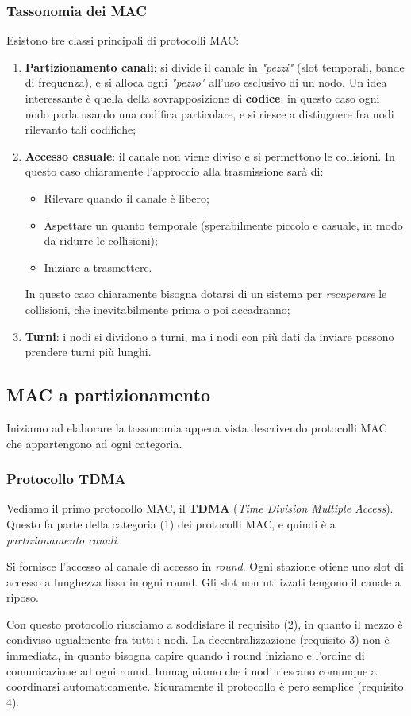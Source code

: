 \documentclass[a4paper,11pt]{article}
\begin{document}
\subsubsection{Tassonomia dei MAC}
Esistono tre classi principali di protocolli MAC:
\begin{enumerate}
	\item \textbf{Partizionamento canali}: si divide il canale in \textit{"pezzi"} (slot temporali, bande di frequenza), e si alloca ogni \textit{"pezzo"} all'uso esclusivo di un nodo.
		Un idea interessante è quella della sovrapposizione di \textbf{codice}: in questo caso ogni nodo parla usando una codifica particolare, e si riesce a distinguere fra nodi rilevanto tali codifiche;
	\item \textbf{Accesso casuale}: il canale non viene diviso e si permettono le collisioni. In questo caso chiaramente l'approccio alla trasmissione sarà di:
		\begin{itemize}
			\item Rilevare quando il canale è libero;
			\item Aspettare un quanto temporale (sperabilmente piccolo e casuale, in modo da ridurre le collisioni);
			\item Iniziare a trasmettere.
		\end{itemize}

		In questo caso chiaramente bisogna dotarsi di un sistema per \textit{recuperare} le collisioni, che inevitabilmente prima o poi accadranno;
	\item \textbf{Turni}: i nodi si dividono a turni, ma i nodi con più dati da inviare possono prendere turni più lunghi.
\end{enumerate}

\subsection{MAC a partizionamento}
Iniziamo ad elaborare la tassonomia appena vista descrivendo protocolli MAC che appartengono ad ogni categoria.

\subsubsection{Protocollo TDMA}
Vediamo il primo protocollo MAC, il \textbf{TDMA} (\textit{Time Division Multiple Access}). Questo fa parte della categoria (1) dei protocolli MAC, e quindi è a \textit{partizionamento canali}. 

Si fornisce l'accesso al canale di accesso in \textit{round}.
Ogni stazione otiene uno slot di accesso a lunghezza fissa in ogni round.
Gli slot non utilizzati tengono il canale a riposo.

Con questo protocollo riusciamo a soddisfare il requisito (2), in quanto il mezzo è condiviso ugualmente fra tutti i nodi. La decentralizzazione (requisito 3) non è immediata, in quanto bisogna capire quando i round iniziano e l'ordine di comunicazione ad ogni round.
Immaginiamo che i nodi riescano comunque a coordinarsi automaticamente.
Sicuramente il protocollo è pero semplice (requisito 4).
\end{document}
